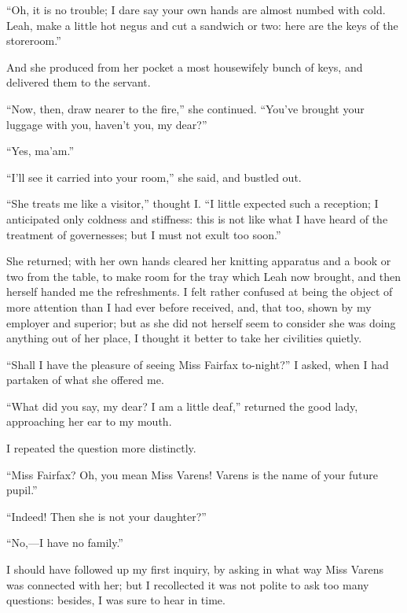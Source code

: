 \enquote{Oh, it is no trouble; I dare say your own hands are almost
	numbed with cold. Leah, make a little hot negus and cut a sandwich or
	two: here are the keys of the storeroom.}

And she produced from her pocket a most housewifely bunch of keys, and
delivered them to the servant.

\enquote{Now, then, draw nearer to the fire,} she continued.
\enquote{You've brought your luggage with you, haven't you, my dear?}

\enquote{Yes, ma'am.}

\enquote{I'll see it carried into your room,} she said, and bustled out.

\enquote{She treats me like a visitor,} thought I\@. \enquote{I little
	expected such a reception; I anticipated only coldness and stiffness:
	this is not like what I have heard of the treatment of governesses; but
	I must not exult too soon.}

She returned; with her own hands cleared her knitting apparatus and a
book or two from the table, to make room for the tray which Leah now
brought, and then herself handed me the refreshments. I felt rather
confused at being the object of more attention than I had ever before
received, and, that too, shown by my employer and superior; but as she
did not herself seem to consider she was doing anything out of her
place, I thought it better to take her civilities quietly.

\enquote{Shall I have the pleasure of seeing Miss Fairfax to-night?} I
asked, when I had partaken of what she offered me.

\enquote{What did you say, my dear? I am a little deaf,} returned the
good lady, approaching her ear to my mouth.

I repeated the question more distinctly.

\enquote{Miss Fairfax? Oh, you mean Miss Varens! Varens is the name of
	your future pupil.}

\enquote{Indeed! Then she is not your daughter?}

\enquote{No,---I have no family.}

I should have followed up my first inquiry, by asking in what way Miss
Varens was connected with her; but I recollected it was not polite to
ask too many questions: besides, I was sure to hear in time.


